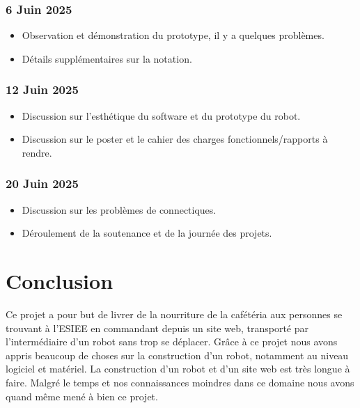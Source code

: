 \documentclass[a4paper,12pt]{report}  %
\begin{document}
\subsubsection{6 Juin 2025}
\begin{itemize}%
	\item Observation et démonstration du prototype, il y a quelques problèmes.
	\item Détails supplémentaires sur la notation.
\end{itemize}

\subsubsection{12 Juin 2025}
\begin{itemize}%
	\item Discussion sur l’esthétique du software et du prototype du robot.
	\item Discussion sur le poster et le cahier des charges fonctionnels/rapports à rendre.
\end{itemize}

\subsubsection{20 Juin 2025}
\begin{itemize}%
	\item Discussion sur les problèmes de connectiques.
	\item Déroulement de la soutenance et de la journée des projets.
\end{itemize}






\pagebreak
\section{Conclusion}

Ce projet a pour but de livrer de la nourriture de la cafétéria aux personnes se trouvant à l’ESIEE en commandant depuis un site web, transporté par l’intermédiaire d’un robot sans trop se déplacer. Grâce à ce projet nous avons appris beaucoup de choses sur la construction d’un robot, notamment au niveau logiciel et matériel. La construction d’un robot et d’un site web est très longue à faire. Malgré le temps et nos connaissances moindres dans ce domaine nous avons quand même mené à bien ce projet.
\end{document}
